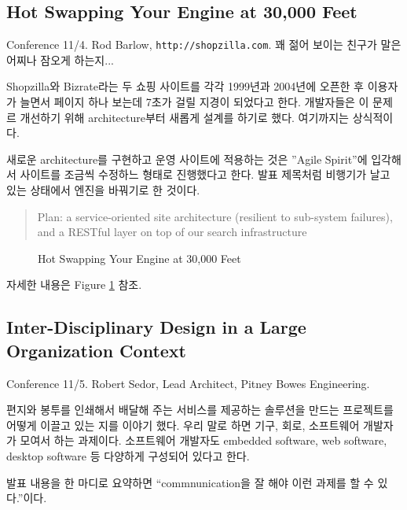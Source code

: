 \documentclass[11pt]{article}
\begin{document}
\subsection{Hot Swapping Your Engine at 30,000 Feet}

Conference 11/4. Rod Barlow, \texttt{http://shopzilla.com}.
꽤 젊어 보이는 친구가 말은 어찌나 잠오게 하는지...
 
Shopzilla와 Bizrate라는 두 쇼핑 사이트를 각각 1999년과 2004년에 오픈한
후 이용자가 늘면서 페이지 하나 보는데 7초가 걸릴 지경이 되었다고 한다.
개발자들은 이 문제르 개선하기 위해 architecture부터 새롭게 설계를 하기로 했다.
여기까지는 상식적이다.

새로운 architecture를 구현하고 운영 사이트에 적용하는 것은 ''Agile Spirit''에
입각해서 사이트를 조금씩 수정하느 형태로 진행했다고 한다. 발표 제목처럼
비행기가 날고 있는 상태에서 엔진을 바꿔기로 한 것이다.
 
\begin{quote}
Plan: a service-oriented site architecture (resilient to
sub-system failures), and a RESTful layer on top of our search
infrastructure
\end{quote}

\begin{figure}[t]
    \begin{Frame}
        \begin{center}
        \end{center}
    \end{Frame}
    \caption{Hot Swapping Your Engine at 30,000 Feet}
    \label{swapping engine}
\end{figure}

자세한 내용은 Figure \ref{swapping engine} 참조.

\subsection{Inter-Disciplinary Design in a Large
  Organization Context}

Conference 11/5. Robert Sedor, Lead Architect, Pitney Bowes Engineering.

편지와 봉투를 인쇄해서 배달해 주는 서비스를 제공하는 솔루션을 만드는
프로젝트를 어떻게 이끌고 있는 지를 이야기 했다.
우리 말로 하면 기구, 회로, 소프트웨어 개발자가 모여서 하는
과제이다. 소프트웨어 개발자도 embedded software, web software, desktop
software 등 다양하게 구성되어 있다고 한다.
 
발표 내용을 한 마디로 요약하면 ``commnunication을 잘 해야 이런 과제를 할 수 
있다.''이다.
 
\end{document}
